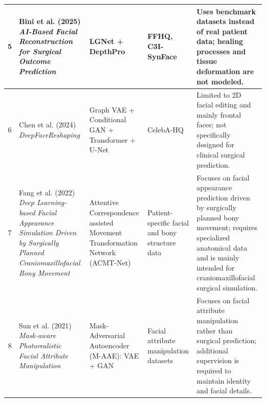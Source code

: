 \begin{longtable}[l]{|c|p{3.2cm}|p{3.2cm}|p{2.5cm}|p{4.0cm}|}
5 &
Bini et al. (2025) \cite{bini2025facial} \newline
\textit{AI-Based Facial Reconstruction for Surgical Outcome Prediction} &
LGNet + DepthPro &
FFHQ, C3I-SynFace &
Uses benchmark datasets instead of real patient data; healing processes and tissue deformation are not modeled. \\ \hline

6 &
Chen et al. (2024) \cite{chen2024deepface} \newline
\textit{DeepFaceReshaping} &
Graph VAE + Conditional GAN + Transformer + U-Net &
CelebA-HQ &
Limited to 2D facial editing and mainly frontal faces; not specifically designed for clinical surgical prediction. \\ \hline

7 &
Fang et al. (2022) \cite{fang2022acmt} \newline
\textit{Deep Learning-based Facial Appearance Simulation Driven by Surgically Planned Craniomaxillofacial Bony Movement} &
Attentive Correspondence assisted Movement Transformation Network (ACMT-Net) &
Patient-specific facial and bony structure data &
Focuses on facial appearance prediction driven by surgically planned bony movement; requires specialized anatomical data and is mainly intended for craniomaxillofacial surgical simulation. \\ \hline

8 &
Sun et al. (2021) \cite{sun2021maskaware} \newline
\textit{Mask-aware Photorealistic Facial Attribute Manipulation} &
Mask-Adversarial Autoencoder (M-AAE): VAE + GAN &
Facial attribute manipulation datasets &
Focuses on facial attribute manipulation rather than surgical prediction; additional supervision is required to maintain identity and facial details. \\ \hline

\end{longtable}



